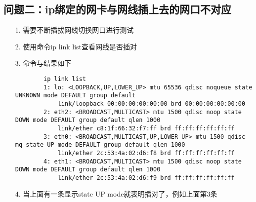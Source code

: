 \documentclass[a4paper,left=1.5cm,right=1.5cm,11pt]{article}
\begin{document}
\subsection{问题二：ip绑定的网卡与网线插上去的网口不对应}
\begin{itemize}
	\item[1.]需要不断插拔网线切换网口进行测试
	\item[2.]使用命令ip link list查看网线是否插对
	\item[3.]命令与结果如下
        \begin{lstlisting}
        ip link list
        1: lo: <LOOPBACK,UP,LOWER_UP> mtu 65536 qdisc noqueue state UNKNOWN mode DEFAULT group default 
            link/loopback 00:00:00:00:00:00 brd 00:00:00:00:00:00
        2: eth2: <BROADCAST,MULTICAST> mtu 1500 qdisc noop state DOWN mode DEFAULT group default qlen 1000
            link/ether c8:1f:66:32:f7:ff brd ff:ff:ff:ff:ff:ff
        3: eth0: <BROADCAST,MULTICAST,UP,LOWER_UP> mtu 1500 qdisc mq state UP mode DEFAULT group default qlen 1000
            link/ether 2c:53:4a:02:d6:f8 brd ff:ff:ff:ff:ff:ff
        4: eth1: <BROADCAST,MULTICAST> mtu 1500 qdisc noop state DOWN mode DEFAULT group default qlen 1000
            link/ether 2c:53:4a:02:d6:f9 brd ff:ff:ff:ff:ff:ff
        \end{lstlisting}
	\item[4.]当上面有一条显示state UP mode就表明插对了，例如上面第3条
\end{itemize}
\end{document}
